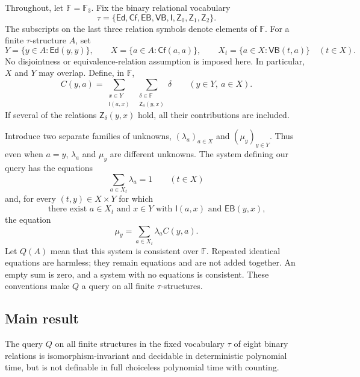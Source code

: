 Throughout, let $\mathbb F=\mathbb F_3$.  Fix the binary relational vocabulary
\[
 \tau=\{\mathsf{Ed},\mathsf{Cf},\mathsf{EB},\mathsf{VB},
             \mathsf I,\mathsf Z_0,\mathsf Z_1,\mathsf Z_2\}.
\]
The subscripts on the last three relation symbols denote elements of
$\mathbb F$.  For a finite $\tau$-structure $A$, set
\[
 Y=\{y\in A:\mathsf{Ed}(y,y)\},\qquad
 X=\{a\in A:\mathsf{Cf}(a,a)\},\qquad
 X_t=\{a\in X:\mathsf{VB}(t,a)\}\quad(t\in X).
\]
No disjointness or equivalence-relation assumption is imposed here.  In
particular, $X$ and $Y$ may overlap.  Define, in $\mathbb F$,
\begin{equation}\label{eq:query-coefficient}
 C(y,a)=\sum_{\substack{x\in Y\\\mathsf I(a,x)}}
          \ \sum_{\substack{\delta\in\mathbb F\\
                              \mathsf Z_\delta(y,x)}}\delta
       \qquad(y\in Y,\ a\in X).
\end{equation}
If several of the relations $\mathsf Z_\delta(y,x)$ hold, all their
contributions are included.

Introduce two separate families of unknowns,
$(\lambda_a)_{a\in X}$ and $(\mu_y)_{y\in Y}$.  Thus even when $a=y$,
$\lambda_a$ and $\mu_y$ are different unknowns.  The system defining our
query has the equations
\begin{equation}\label{eq:query-normalization}
 \sum_{a\in X_t}\lambda_a=1\qquad(t\in X)
\end{equation}
and, for every $(t,y)\in X\times Y$ for which
\begin{equation}\label{eq:query-incidence-test}
 \text{there exist $a\in X_t$ and $x\in Y$ with
          $\mathsf I(a,x)$ and $\mathsf{EB}(y,x)$,}
\end{equation}
the equation
\begin{equation}\label{eq:query-consistency}
 \mu_y=\sum_{a\in X_t}\lambda_a C(y,a).
\end{equation}
Let $Q(A)$ mean that this system is consistent over $\mathbb F$.
Repeated identical equations are harmless; they remain equations and are
not added together.  An empty sum is zero, and a system with no equations
is consistent.  These conventions make $Q$ a query on all finite
$\tau$-structures.

\subsection{Main result}

\begin{theorem}\label{thm:main}
The query $Q$ on all finite structures in the fixed vocabulary $\tau$ of
eight binary relations is isomorphism-invariant and decidable in
deterministic polynomial time, but is not definable in full choiceless
polynomial time with counting.
\end{theorem}

